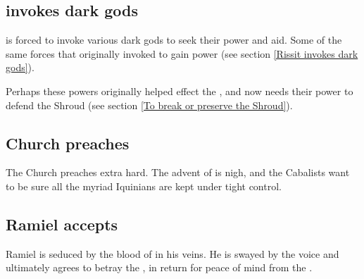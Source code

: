 \begin{garbage}
\subsection{\Ishnaruchaefir{} invokes dark gods}
\Ishnaruchaefir{} is forced to invoke various dark gods to seek their power and aid. Some of the same forces that \Secherdamon{} originally invoked to gain power (see section \ref{Rissit invokes dark gods}). 

Perhaps these powers originally helped effect the \hs{\SecondShrouding}, and now \Ishnaruchaefir{} needs their power to defend the Shroud (see section \ref{To break or preserve the Shroud}).









\subsection{\Iquinian{} Church preaches}
The \Iquinian{} Church preaches extra hard. 
The advent of \Lithrim{} is nigh, and the Cabalists want to be sure all the myriad Iquinians are kept under tight control. 








\subsection{Ramiel accepts \NexagglachelsCurse}
Ramiel is seduced by the blood of \Nexagglachel{} in his veins. 
He is swayed by the \dragonlordz{} voice and ultimately agrees to betray the \banelords, in return for peace of mind from the .









\end{garbage}

